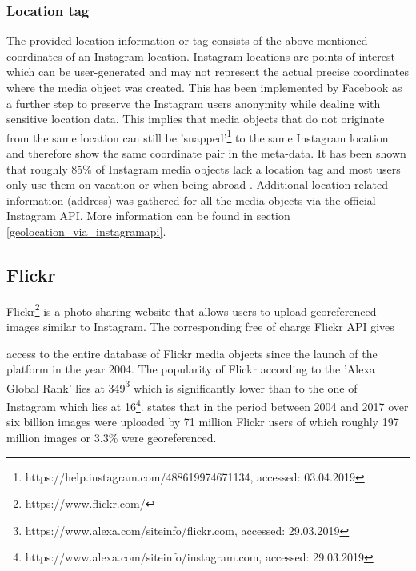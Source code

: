 \subsubsection*{Location tag} \label{instagram_location_tag}
The provided location information or tag consists of the above mentioned coordinates of an Instagram location. Instagram locations are points of interest which can be user-generated and may not represent the actual precise coordinates where the media object was created. This has been implemented by Facebook as a further step to preserve the Instagram users anonymity while dealing with sensitive location data. This implies that media objects that do not originate from the same location can still be 'snapped'\footnote{https://help.instagram.com/488619974671134, accessed: 03.04.2019} to the same Instagram location and therefore show the same coordinate pair in the meta-data.
It has been shown that roughly 85\% of Instagram media objects lack a location tag and most users only use them on vacation or when being abroad \parencite{Flatow2015}.
Additional location related information (address) was gathered for all the media objects via the official Instagram API. More information can be found in section \ref{geolocation_via_instagramapi}.



\subsection{Flickr} \label{flickr}
Flickr\footnote{https://www.flickr.com/} is a photo sharing website that allows users to upload georeferenced images similar to Instagram. The corresponding free of charge Flickr API gives

\renewcommand{\thefootnote}{\alph{footnote}}

access to the entire database of Flickr media objects since the launch of the platform in the year 2004. The popularity of Flickr according to the 'Alexa Global Rank' lies at 349\footnote{https://www.alexa.com/siteinfo/flickr.com, accessed: 29.03.2019} which is significantly lower than to the one of Instagram which lies at 16\footnote{https://www.alexa.com/siteinfo/instagram.com, accessed: 29.03.2019}. \textcite{Tenkanen2017} states that in the period between 2004 and 2017 over six billion images were uploaded by 71 million Flickr users of which roughly 197 million images or 3.3\% were georeferenced. 

\renewcommand{\thefootnote}{\arabic{footnote}}

